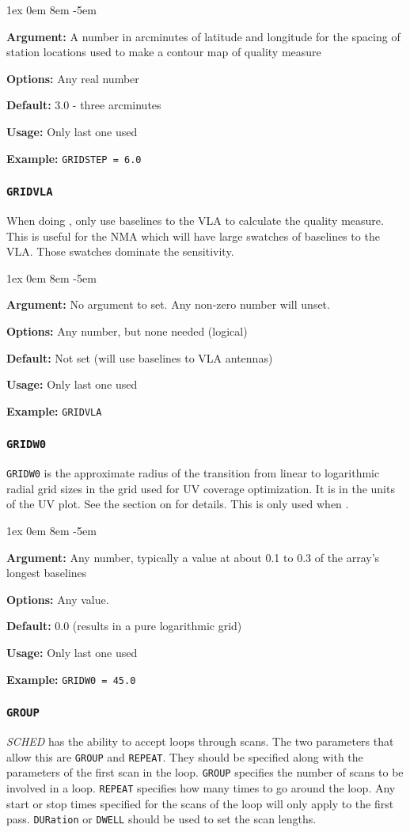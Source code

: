 \documentclass{report}
\newcommand{\rcwbox}[5]{
  \begin{list}{}{\parsep 1ex  \itemsep 0em
                 \leftmargin 8em  \itemindent -5em }
    \item {\bf Argument:} #1
    \item {\bf Options:}  #2
    \item {\bf Default:}  #3
    \item {\bf Usage:}    #4
    \item {\bf Example:}  #5
  \end{list}
}
\begin{document}
\rcwbox
{A number in arcminutes of latitude and longitude for the spacing of
station locations used to make a contour map of quality measure}
{Any real number}
{3.0 - three arcminutes}
{Only last one used}
{{\tt GRIDSTEP = 6.0}}

\subsubsection{\label{MP:GRIDVLA}{\tt GRIDVLA}}

When doing , only use baselines
to the VLA to calculate the quality measure.  This is useful for the NMA
which will have large swatches of baselines to the VLA.  Those swatches
dominate the sensitivity.

\rcwbox
{No argument to set.  Any non-zero number will unset.}
{Any number, but none needed (logical)}
{Not set (will use baselines to VLA antennas)}
{Only last one used}
{{\tt GRIDVLA}}

\subsubsection{\label{MP:GRIDW0}{\tt GRIDW0}}

{\tt GRIDW0} is the approximate radius of the transition
from linear to logarithmic radial grid sizes in the grid used for UV
coverage optimization.  It is in the units of the UV plot.
See the section on  for details.  This is only used when
.

\rcwbox
{Any number, typically a value at about 0.1 to 0.3 of the array's longest
baselines}
{Any value.}
{0.0 (results in a pure logarithmic grid)}
{Only last one used}
{{\tt GRIDW0 = 45.0}}


\subsubsection{\label{MP:GROUP}{\tt GROUP}}

{\em SCHED} has the ability to accept loops through scans.  The two
parameters that allow this are {\tt GROUP} and {\tt REPEAT}.  They
should be specified along with the parameters of the first scan in the
loop.  {\tt GROUP} specifies the number of scans to be involved in a
loop.  {\tt REPEAT} specifies how many times to go around the loop.
Any start or stop times specified for the scans of the loop will
only apply to the first pass.  {\tt DURation} or {\tt DWELL} should
be used to set the scan lengths.
\end{document}
